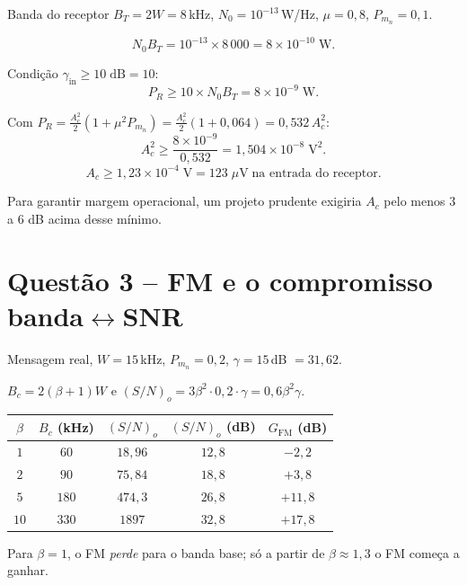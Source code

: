 \documentclass[11pt,a4paper]{article}
\begin{document}
\begin{resolucao}

Banda do receptor $B_T = 2W = 8$\,kHz, $N_0 = 10^{-13}$\,W/Hz, $\mu = 0{,}8$, $P_{m_n} = 0{,}1$.

\[
  N_0 B_T = 10^{-13} \times 8\,000 = 8 \times 10^{-10}\;\text{W}.
\]

Condição $\gamma_{\text{in}} \ge 10\;\text{dB} = 10$:
\[
  P_R \ge 10 \times N_0 B_T = 8 \times 10^{-9}\;\text{W}.
\]

Com $P_R = \tfrac{A_c^2}{2}(1 + \mu^2 P_{m_n}) = \tfrac{A_c^2}{2}(1 + 0{,}064) = 0{,}532\,A_c^2$:
\[
  A_c^2 \ge \frac{8\times 10^{-9}}{0{,}532} = 1{,}504 \times 10^{-8}\;\text{V}^2.
\]
\[
  \boxed{A_c \ge 1{,}23 \times 10^{-4}\;\text{V} = 123\;\mu\text{V}\;\text{na entrada do receptor.}}
\]

Para garantir margem operacional, um projeto prudente exigiria $A_c$ pelo menos 3 a 6 dB acima desse mínimo.
\end{resolucao}

\section*{Questão 3 -- FM e o compromisso banda$\leftrightarrow$SNR}

\begin{resolucao}

Mensagem real, $W = 15$\,kHz, $P_{m_n} = 0{,}2$, $\gamma = 15$\,dB $= 31{,}62$.

$B_c = 2(\beta+1)W$ e $(S/N)_o = 3\beta^2 \cdot 0{,}2 \cdot \gamma = 0{,}6\beta^2 \gamma$.

\begin{center}
\begin{tabular}{ccccc}
\toprule
$\beta$ & $B_c$ (kHz) & $(S/N)_o$ & $(S/N)_o$ (dB) & $G_{\text{FM}}$ (dB) \\
\midrule
$1$  & $60$  & $18{,}96$  & $12{,}8$ & $-2{,}2$ \\
$2$  & $90$  & $75{,}84$  & $18{,}8$ & $+3{,}8$ \\
$5$  & $180$ & $474{,}3$  & $26{,}8$ & $+11{,}8$ \\
$10$ & $330$ & $1897$     & $32{,}8$ & $+17{,}8$ \\
\bottomrule
\end{tabular}
\end{center}

Para $\beta = 1$, o FM \emph{perde} para o banda base; só a partir de $\beta \approx 1{,}3$ o FM começa a ganhar.
\end{resolucao}
\end{document}
